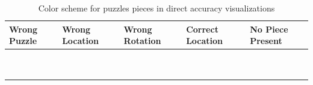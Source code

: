 \begin{table}[t!]
	\begin{center}
	\caption{Color scheme for puzzles pieces in direct accuracy visualizations}\label{tab:directAccuracyColors}
  		\begin{tabular}{ | >{\centering\arraybackslash}m{0.9in} | >{\centering\arraybackslash}m{0.9in} | >{\centering\arraybackslash}m{0.9in} | >{\centering\arraybackslash}m{0.9in} | >{\centering\arraybackslash}m{0.9in} | }
 \hline
    		Wrong Puzzle & Wrong Location & Wrong Rotation & Correct Location  & No Piece Present  \\ \hline
			{\cellcolor{blue}~} & {\cellcolor{red}~}  & {\cellcolor{orange}~}  & {\cellcolor{green}~} & {\cellcolor{black}~}  \\
			{\cellcolor{blue}~} & {\cellcolor{red}~}  & {\cellcolor{orange}~}  & {\cellcolor{green}~} & {\cellcolor{black}~} \\
 \hline
		\end{tabular}
	\end{center}
\end{table}

